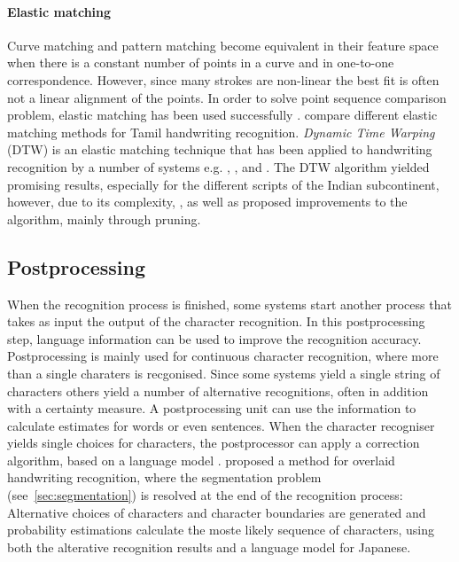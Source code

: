 \paragraph{Elastic matching}
Curve matching and pattern matching become equivalent in their feature space
when there is a constant number of points in a curve and in one-to-one 
correspondence. However, since many strokes are non-linear the best fit is often
not a linear alignment of the points.
In order to solve point sequence comparison problem, elastic matching has 
been used successfully .
 compare different elastic matching methods for Tamil 
handwriting recognition. \emph{Dynamic Time Warping} (DTW) is an elastic 
matching technique that has been applied to handwriting recognition by a number 
of systems e.g. , , 
 and .
The DTW algorithm yielded promising results, especially for the different scripts
of the Indian subcontinent, however, due to its complexity, 
,  as well as  
proposed improvements to the algorithm, mainly through pruning.

\subsection{Postprocessing}
\label{sec:postprocessing}

When the recognition process is finished, some systems start another process
that takes as input the output of the character recognition. In this 
postprocessing step, language information can be used to improve the recognition
accuracy. Postprocessing is mainly used for continuous character recognition,
where more than a single charaters is recgonised. Since some systems yield a 
single string of characters others yield a number of alternative recognitions,
often in addition with a certainty measure.
A postprocessing unit can use the information to calculate estimates for words
or even sentences. When the character recogniser yields single choices for 
characters, the postprocessor can apply a correction algorithm, based on a 
language model .
 proposed a method for overlaid handwriting 
recognition, where the segmentation problem (see~\ref{sec:segmentation}) is 
resolved at the end of the recognition process: Alternative choices of characters
and character boundaries are generated and probability estimations calculate
the moste likely sequence of characters, using both the alterative recognition
results and a language model for Japanese.

